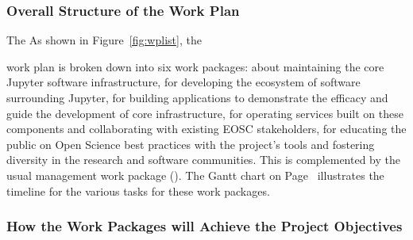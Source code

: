 

\subsubsection{Overall Structure of the Work Plan}\label{sec:workplan-structure}
\ifgrantagreement
The
\else
As shown in Figure~\ref{fig:wplist}, the
\fi

work plan is broken down into
six work packages:
 about maintaining the core Jupyter software infrastructure,
 for developing the ecosystem of software surrounding Jupyter,
 for building applications to demonstrate the efficacy and guide the development
of core infrastructure,
 for operating services built on these
components and collaborating with existing EOSC stakeholders,
 for educating the public on Open Science best practices with the project's tools
and fostering diversity in the research and software communities.
This is complemented by
the usual management  work package
(). The Gantt chart on
Page~\pageref{fig:gantt} illustrates the timeline for the various
tasks for these work packages.

\ifgrantagreement\else
\wpfigstyle{\footnotesize\def\tabcolsep{3.5pt}}
{\wpfig}
\fi

\subsubsection{How the Work Packages will Achieve the Project Objectives}
\label{sssec:how_the_work_packages_will_achieve}

